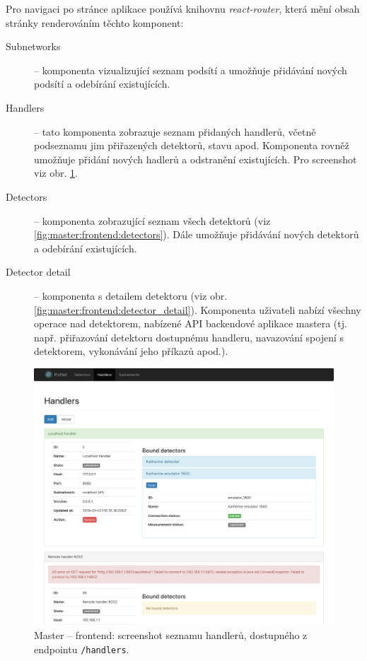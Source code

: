 Pro navigaci po stránce aplikace používá knihovnu \textit{react-router}, která mění obsah stránky renderováním těchto komponent:

\begin{description}
    \item[Subnetworks] -- komponenta vizualizující seznam podsítí a umožňuje přidávání nových podsítí a odebírání existujících.
    \item[Handlers] -- tato komponenta zobrazuje seznam přidaných handlerů, včetně podseznamu jim přiřazených detektorů, stavu apod. Komponenta rovněž umožňuje přidání nových hadlerů a odstranění existujících. Pro screenshot viz obr. \ref{fig:master:frontend:handlers}.
    \item[Detectors] -- komponenta zobrazující seznam všech detektorů (viz \ref{fig:master:frontend:detectors}). Dále umožňuje přidávání nových detektorů a odebírání existujících.
    \item[Detector detail] -- komponenta s detailem detektoru (viz obr. \ref{fig:master:frontend:detector_detail}). Komponenta uživateli nabízí všechny operace nad detektorem, nabízené API backendové aplikace mastera (tj. např. přiřazování detektoru dostupnému handleru, navazování spojení s detektorem, vykonávání jeho příkazů apod.).
\end{description}

\begin{figure}[h]
	\begin{center}
        \includegraphics[width=15cm]{figures/master_handlers.png}
	\end{center}
	\caption{Master -- frontend: screenshot seznamu handlerů, dostupného z endpointu \texttt{/handlers}.}
	\label{fig:master:frontend:handlers}
\end{figure}

